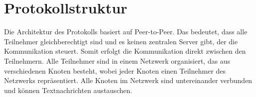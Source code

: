 \section{Protokollstruktur}
\label{sec:protokolldesign_und_struktur}


Die Architektur des Protokolls basiert auf Peer-to-Peer. Das bedeutet, dass
alle Teilnehmer gleichberechtigt sind und es keinen zentralen Server gibt, der
die Kommunikation steuert. Somit erfolgt die Kommunikation direkt zwischen den
Teilnehmern. Alle Teilnehmer sind in einem Netzwerk organisiert, das aus
verschiedenen Knoten besteht, wobei jeder Knoten einen Teilnehmer des Netzwerks repräsentiert.
Alle Knoten im Netzwerk sind untereinander verbunden und können Textnachrichten austauschen.









%



%

%

%




